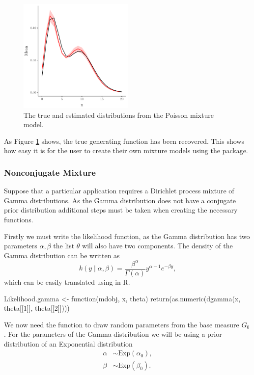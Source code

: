 \documentclass[nojss]{jss}
\begin{document}
\begin{figure}[tb]
\centering
	\includegraphics[width=0.5\textwidth]{img/poisson_mixture_plot.pdf}
\caption{The true and estimated distributions from the Poisson mixture model.}
\label{fig:poissonmixture}
\end{figure}
As Figure \ref{fig:poissonmixture} shows, the true generating function has been recovered. This shows how easy it is for the user to create their own mixture models using the  package.



\subsubsection{Nonconjugate Mixture}
Suppose that a particular application requires a Dirichlet process mixture of Gamma distributions. As the Gamma distribution does not have a conjugate prior distribution additional steps must be taken when creating the necessary functions.

Firstly we must write the likelihood function, as the Gamma distribution has two parameters $\alpha, \beta$ the list $\theta$ will also have two components. The density of the Gamma distribution can be written as
\begin{equation*}
k(y \mid \alpha, \beta) = \frac{\beta ^ \alpha}{\Gamma (\alpha)} y^{\alpha -1} e ^{- \beta y},
\end{equation*}
which can be easily translated using  in R.
\begin{CodeInput}
Likelihood.gamma <- function(mdobj, x, theta){
  return(as.numeric(dgamma(x, theta[[1]], theta[[2]])))
}
\end{CodeInput}

We now need the function to draw random parameters from the base measure $G_0$. For the parameters of the Gamma distribution we will be using a prior distribution of an Exponential distribution
\begin{align*}
\alpha & \sim \text{Exp} (\alpha _0), \\
\beta & \sim \text{Exp} (\beta _0).
\end{align*}
\end{document}
